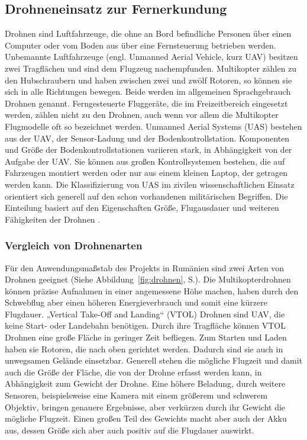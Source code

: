\subsection{Drohneneinsatz zur Fernerkundung}

Drohnen sind Luftfahrzeuge, die ohne an Bord befindliche Personen über einen Computer oder vom Boden aus über eine Fernsteuerung betrieben werden. Unbemannte Luftfahrzeuge (engl. Unmanned Aerial Vehicle, kurz UAV) besitzen zwei Tragflächen und sind dem Flugzeug nachempfunden. Multikopter zählen zu den Hubschraubern und haben zwischen zwei und zwölf Rotoren, so können sie sich in alle Richtungen bewegen. Beide werden im allgemeinen Sprachgebrauch Drohnen genannt. Ferngesteuerte Fluggeräte, die im Freizeitbereich eingesetzt werden, zählen nicht zu den Drohnen, auch wenn vor allem die Multikopter Flugmodelle oft so bezeichnet werden. Unmanned Aerial Systems (UAS) bestehen aus der UAV, der Sensor-Ladung und der Bodenkontrollstation. Komponenten und Größe der Bodenkontrollstationen variieren stark, in Abhängigkeit von der Aufgabe der UAV. Sie können aus großen Kontrollsystemen bestehen, die auf Fahrzeugen montiert werden oder nur aus einem kleinen Laptop, der getragen werden kann. Die Klassifizierung von UAS im zivilen wissenschaftlichen Einsatz orientiert sich generell auf den schon vorhandenen militärischen Begriffen. Die Einteilung basiert auf den Eigenschaften Größe, Flugausdauer und weiteren Fähigkeiten der Drohnen \citep[vgl.][]{Watts2012}.

\subsubsection{Vergleich von Drohnenarten}

Für den Anwendungsmaßstab des Projekts in Rumänien sind zwei Arten von Drohnen geeignet (Siehe Abbildung~\ref{fig:drohnen}, S.\pageref{fig:drohnen}). Die Multikopterdrohnen können präzise Aufnahmen in einer angemessene Höhe machen, haben durch den Schwebflug aber einen höheren Energieverbrauch und somit eine kürzere Flugdauer. „Vertical Take-Off and Landing“ (VTOL) Drohnen sind UAV, die keine Start- oder Landebahn benötigen. Durch ihre Tragfläche können VTOL Drohnen eine große Fläche in geringer Zeit befliegen. Zum Starten und Laden haben sie Rotoren, die nach oben gerichtet werden. Dadurch sind sie auch in unwegsamen Gelände einsetzbar.
Generell stehen die mögliche Flugzeit und damit auch die Größe der Fläche, die von der Drohne erfasst werden kann, in Abhängigkeit zum Gewicht der Drohne. Eine höhere Beladung, durch weitere Sensoren, beispielsweise eine Kamera mit einem größerem und schwerem Objektiv, bringen genauere Ergebnisse, aber verkürzen durch ihr Gewicht die mögliche Flugzeit. Einen großen Teil des Gewichts macht aber auch der Akku aus, dessen Größe sich aber auch positiv auf die Flugdauer auswirkt.

